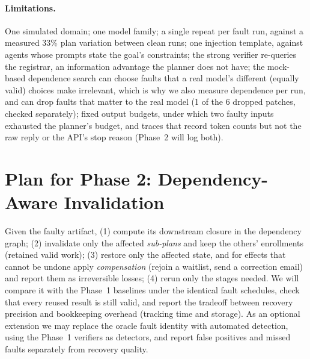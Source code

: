 \documentclass[11pt]{article}
\begin{document}
\paragraph{Limitations.} One simulated domain; one model family; a single
repeat per fault run, against a measured 33\% plan variation between clean
runs; one injection template, against agents whose prompts state the goal's
constraints; the strong verifier re-queries the registrar, an information advantage
the planner does not have; the mock-based dependence search can choose
faults that a real model's different (equally valid) choices make irrelevant,
which is why we also measure dependence per run, and can drop faults that
matter to the real model (1 of the 6 dropped patches, checked separately);
fixed output budgets, under
which two faulty inputs exhausted the planner's budget, and traces that record
token counts but not the raw reply or the API's stop reason (Phase~2 will log
both).

\section{Plan for Phase 2: Dependency-Aware Invalidation}
\label{sec:phase2}
Given the faulty artifact, (1) compute its downstream closure in the
dependency graph; (2) invalidate only the affected \emph{sub-plans} and keep
the others' enrollments (retained valid work); (3) restore only the affected
state, and for effects that cannot be undone apply \emph{compensation} (rejoin
a waitlist, send a correction email) and report them as irreversible losses;
(4) rerun only the stages needed. We will compare it with the Phase~1
baselines under the identical fault schedules, check that every reused result
is still valid, and report the tradeoff between recovery precision and
bookkeeping overhead (tracking time and storage). As an optional extension we
may replace the oracle fault identity with automated detection, using the
Phase~1 verifiers as detectors, and report false positives and missed faults
separately from recovery quality.




\appendix
\end{document}
